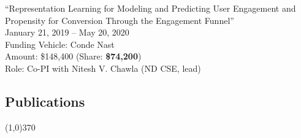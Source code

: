 \documentclass[10pt]{article}
\newenvironment{myindentpar}[1]%
{\begin{list}{}%
         {\setlength{\leftmargin}{#1}}%
         \item[]%
}
{\end{list}}
\newcounter{list}
\begin{document}
\begin{myindentpar}{0.75cm}
\hspace{-0.75cm}``Representation Learning for Modeling and Predicting User Engagement and Propensity for Conversion Through the Engagement Funnel''\\
January 21, 2019 -- May 20, 2020 \\
Funding Vehicle: Conde Nast \\
Amount: \$148,400 (Share: \textbf{\$74,200}) \\
Role: {Co-PI} with Nitesh V. Chawla (ND CSE, lead)

\end{myindentpar}

\newpage

\vspace{-0.6cm}
\subsection{}
\subsection{\sc Publications}
\vspace{-0.4cm} \line(1,0){370} \vspace{-0.1cm}
\end{document}
